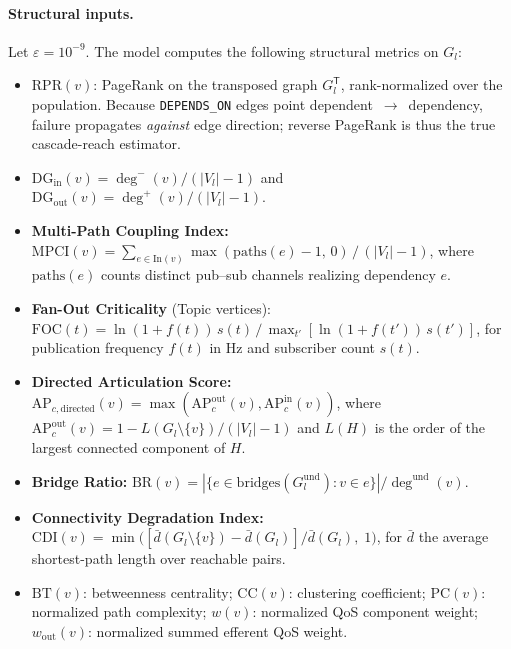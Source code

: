 \paragraph{Structural inputs.}
Let $\varepsilon = 10^{-9}$. The model computes the following structural metrics on $G_l$:
\begin{itemize}
    \item $\mathrm{RPR}(v)$: PageRank on the transposed graph $G_l^{\mathsf T}$, rank-normalized over the population. Because \texttt{DEPENDS\_ON} edges point dependent~$\to$~dependency, failure propagates \emph{against} edge direction; reverse PageRank is thus the true cascade-reach estimator.
    \item $\mathrm{DG}_{\text{in}}(v) = \deg^{-}(v) / (|V_l| - 1)$ and $\mathrm{DG}_{\text{out}}(v) = \deg^{+}(v) / (|V_l| - 1)$.
    \item \textbf{Multi-Path Coupling Index:} $\mathrm{MPCI}(v) = \sum_{e \in \mathrm{In}(v)} \max(\mathrm{paths}(e) - 1,\, 0) \,/\, (|V_l| - 1)$, where $\mathrm{paths}(e)$ counts distinct pub--sub channels realizing dependency $e$.
    \item \textbf{Fan-Out Criticality} (Topic vertices): $\mathrm{FOC}(t) = \ln(1 + f(t))\, s(t) \,/\, \max_{t'} [\ln(1 + f(t'))\, s(t')]$, for publication frequency $f(t)$ in Hz and subscriber count $s(t)$.
    \item \textbf{Directed Articulation Score:} $\mathrm{AP}_{c,\text{directed}}(v) = \max(\mathrm{AP}_c^{\text{out}}(v), \mathrm{AP}_c^{\text{in}}(v))$, where $\mathrm{AP}_{c}^{\text{out}}(v) = 1 - L(G_l \setminus \{v\})/(|V_l|-1)$ and $L(H)$ is the order of the largest connected component of $H$.
    \item \textbf{Bridge Ratio:} $\mathrm{BR}(v) = |\{e \in \mathrm{bridges}(G_l^{\text{und}}) : v \in e\}| / \deg^{\text{und}}(v)$.
    \item \textbf{Connectivity Degradation Index:} $\mathrm{CDI}(v) = \min\!\big( [\bar{d}(G_l \setminus \{v\}) - \bar{d}(G_l)] / \bar{d}(G_l),\; 1 \big)$, for $\bar{d}$ the average shortest-path length over reachable pairs.
    \item $\mathrm{BT}(v)$: betweenness centrality; $\mathrm{CC}(v)$: clustering coefficient; $\mathrm{PC}(v)$: normalized path complexity; $w(v)$: normalized QoS component weight; $w_{\text{out}}(v)$: normalized summed efferent QoS weight.
\end{itemize}

